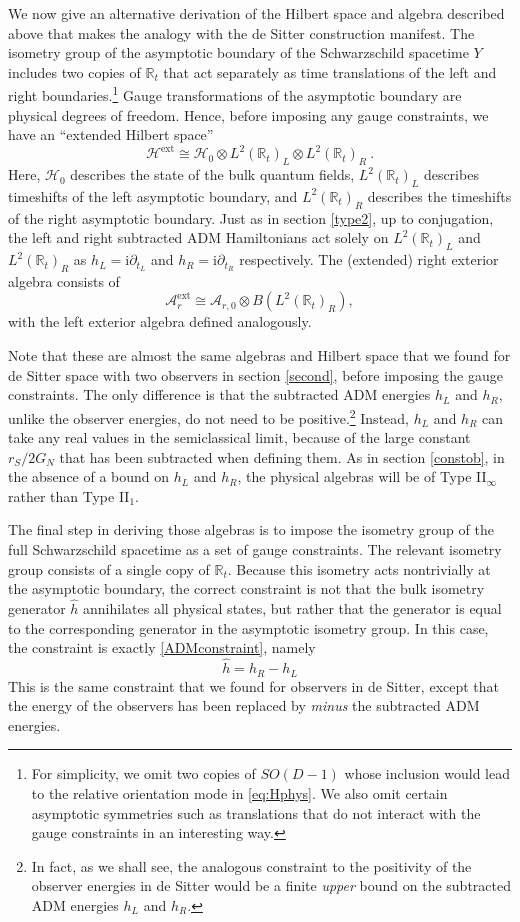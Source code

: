 \documentclass[11pt,a4paper]{article}
\def\be{\begin{equation}}
\def\ee{\end{equation}}
\def\hat{\widehat}
\def\A{{\mathcal A}}
\def\R{{\mathbb R}}
\def\i{{\mathrm i}}
\def\hat{\widehat}
\begin{document}
 We now give an alternative derivation of the Hilbert space and algebra described above that makes the analogy with the de Sitter construction manifest. The isometry group of the asymptotic boundary of the Schwarzschild spacetime $Y$ includes two copies of $\R_t$ that act separately as time translations of the left and right boundaries.\footnote{For simplicity, we omit two copies of $SO(D-1)$ whose inclusion would lead to the relative orientation mode in \eqref{eq:Hphys}. We also omit certain 
 asymptotic symmetries such as translations that do not interact with the gauge constraints in an interesting way.}  Gauge transformations of the asymptotic boundary are physical degrees of freedom. Hence, before imposing any gauge constraints, we have an ``extended Hilbert space''
$$
\mathcal{H}^{\mathrm{ext}} \cong \mathcal{H}_0 \otimes L^2(\R_t)_L  \otimes L^2(\R_t)_R~.
$$
Here, $\mathcal{H}_0$ describes the state of the bulk quantum fields, $L^2(\R_t)_L$ describes timeshifts of the left asymptotic boundary, and $L^2(\R_t)_R $ describes the timeshifts of the right asymptotic boundary. Just as in section \ref{type2},
up to conjugation, the  left and right subtracted ADM Hamiltonians act solely on $L^2(\R_t)_L$ and $L^2(\R_t)_R$ as $h_L = \i \partial_{t_L}$ and $h_R = \i \partial_{t_R}$ respectively. The (extended) right exterior algebra consists of 
\be \label{eq:extendedalgebra}
\A_r^{\mathrm{ext}} \cong \A_{r,0} \otimes B\left(L^2(\R_t)_R\right),
\ee
with the left exterior algebra defined analogously. 

Note that these are almost the same algebras and Hilbert space that we found for de Sitter space with two observers  in section \ref{second}, before imposing the gauge constraints. The only difference is that the subtracted ADM energies $h_L$ and $h_R$, unlike the observer energies, do not need to be positive.\footnote{In fact, as we shall see, the analogous constraint to the positivity of the observer energies in de Sitter would be a finite {\it upper} bound on the subtracted ADM energies $h_L$ and $h_R$.} Instead,  $h_L$ and $h_R$ can take any real values in the semiclassical limit, because of the large constant $r_S/2G_N$ that has been subtracted when defining them. As in section \ref{constob}, in the absence of a bound on $h_L$ and $h_R$,
    the physical algebras will be of Type II$_\infty$ rather than Type II$_1$.

The final step in deriving those algebras is to impose the isometry group of the full Schwarzschild spacetime as a set of gauge  constraints. The relevant isometry group consists of a single copy of $\R_t$. Because this isometry acts nontrivially at the asymptotic boundary, the correct constraint is not that the bulk isometry generator $\hat h$ annihilates all physical states, but rather that the generator is equal to the corresponding generator in the asymptotic isometry group. In this case, the  constraint is exactly \eqref{ADMconstraint}, namely
\be
\hat h = h_R - h_L
\ee
This is the same constraint that we found for observers in de Sitter, except that the energy of the observers has been replaced by \emph{minus} the subtracted ADM energies. 
\end{document}
